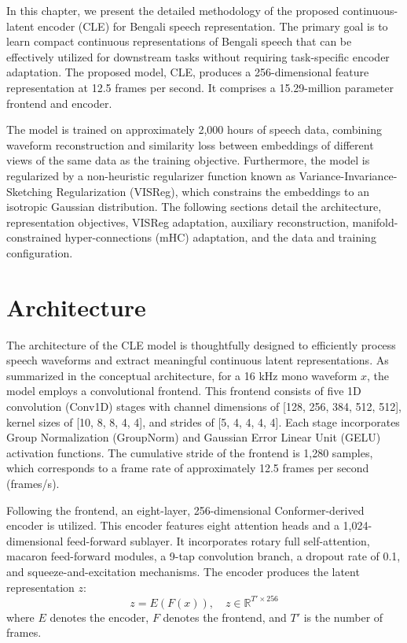 
In this chapter, we present the detailed methodology of the proposed continuous-latent encoder (CLE) for Bengali speech representation. The primary goal is to learn compact continuous representations of Bengali speech that can be effectively utilized for downstream tasks without requiring task-specific encoder adaptation. The proposed model, CLE, produces a 256-dimensional feature representation at 12.5 frames per second. It comprises a 15.29-million parameter frontend and encoder. 

The model is trained on approximately 2,000 hours of speech data, combining waveform reconstruction and similarity loss between embeddings of different views of the same data as the training objective. Furthermore, the model is regularized by a non-heuristic regularizer function known as Variance-Invariance-Sketching Regularization (VISReg), which constrains the embeddings to an isotropic Gaussian distribution. The following sections detail the architecture, representation objectives, VISReg adaptation, auxiliary reconstruction, manifold-constrained hyper-connections (mHC) adaptation, and the data and training configuration.

\section{Architecture}
The architecture of the CLE model is thoughtfully designed to efficiently process speech waveforms and extract meaningful continuous latent representations. As summarized in the conceptual architecture, for a 16 kHz mono waveform $x$, the model employs a convolutional frontend. This frontend consists of five 1D convolution (Conv1D) stages with channel dimensions of [128, 256, 384, 512, 512], kernel sizes of [10, 8, 8, 4, 4], and strides of [5, 4, 4, 4, 4]. Each stage incorporates Group Normalization (GroupNorm) and Gaussian Error Linear Unit (GELU) activation functions. The cumulative stride of the frontend is 1,280 samples, which corresponds to a frame rate of approximately 12.5 frames per second (frames/s).

Following the frontend, an eight-layer, 256-dimensional Conformer-derived encoder is utilized. This encoder features eight attention heads and a 1,024-dimensional feed-forward sublayer. It incorporates rotary full self-attention, macaron feed-forward modules, a 9-tap convolution branch, a dropout rate of 0.1, and squeeze-and-excitation mechanisms. The encoder produces the latent representation $z$:
\begin{equation}
z = E(F(x)), \quad z \in \mathbb{R}^{T' \times 256}
\end{equation}
where $E$ denotes the encoder, $F$ denotes the frontend, and $T'$ is the number of frames. 

